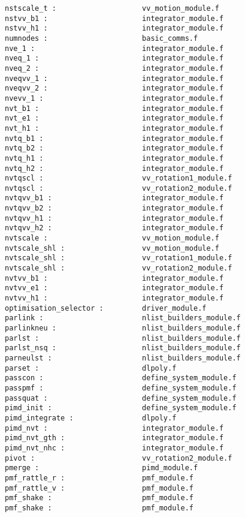 \begin{verbatim}
nstscale_t :                    vv_motion_module.f
nstvv_b1 :                      integrator_module.f
nstvv_h1 :                      integrator_module.f
numnodes :                      basic_comms.f 
nve_1 :                         integrator_module.f
nveq_1 :                        integrator_module.f
nveq_2 :                        integrator_module.f
nveqvv_1 :                      integrator_module.f
nveqvv_2 :                      integrator_module.f
nvevv_1 :                       integrator_module.f
nvt_b1 :                        integrator_module.f
nvt_e1 :                        integrator_module.f
nvt_h1 :                        integrator_module.f
nvtq_b1 :                       integrator_module.f
nvtq_b2 :                       integrator_module.f
nvtq_h1 :                       integrator_module.f
nvtq_h2 :                       integrator_module.f
nvtqscl :                       vv_rotation1_module.f
nvtqscl :                       vv_rotation2_module.f
nvtqvv_b1 :                     integrator_module.f
nvtqvv_b2 :                     integrator_module.f
nvtqvv_h1 :                     integrator_module.f
nvtqvv_h2 :                     integrator_module.f
nvtscale :                      vv_motion_module.f
nvtscale_shl :                  vv_motion_module.f
nvtscale_shl :                  vv_rotation1_module.f
nvtscale_shl :                  vv_rotation2_module.f
nvtvv_b1 :                      integrator_module.f
nvtvv_e1 :                      integrator_module.f
nvtvv_h1 :                      integrator_module.f
optimisation_selector :         driver_module.f
parlink :                       nlist_builders_module.f
parlinkneu :                    nlist_builders_module.f
parlst :                        nlist_builders_module.f
parlst_nsq :                    nlist_builders_module.f
parneulst :                     nlist_builders_module.f
parset :                        dlpoly.f
passcon :                       define_system_module.f
passpmf :                       define_system_module.f
passquat :                      define_system_module.f
pimd_init :                     define_system_module.f
pimd_integrate :                dlpoly.f
pimd_nvt :                      integrator_module.f
pimd_nvt_gth :                  integrator_module.f
pimd_nvt_nhc :                  integrator_module.f
pivot :                         vv_rotation2_module.f
pmerge :                        pimd_module.f
pmf_rattle_r :                  pmf_module.f
pmf_rattle_v :                  pmf_module.f
pmf_shake :                     pmf_module.f
pmf_shake :                     pmf_module.f

\end{verbatim}
